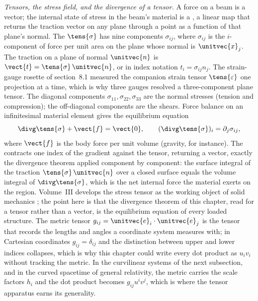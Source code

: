 \begin{mastery}
\textit{Tensors, the stress field, and the divergence of a tensor.}
A force on a beam is a vector; the internal state of stress in the
beam's material is a , a linear map that returns the
traction vector on any plane through a point as a function of that
plane's normal. The  $\tens{\sigma}$ has
nine components $\sigma_{ij}$, where $\sigma_{ij}$ is the $i$-component
of force per unit area on the plane whose normal is $\unitvec{x}_{j}$.
The traction on a plane of normal $\unitvec{n}$ is $\vect{t} =
\tens{\sigma}\,\unitvec{n}$, or in index notation $t_{i} =
\sigma_{ij}n_{j}$. The strain-gauge rosette of section~8.1 measured
the companion strain tensor $\tens{\varepsilon}$ one projection at a
time, which is why three gauges resolved a three-component plane
tensor. The diagonal components $\sigma_{11}, \sigma_{22},
\sigma_{33}$ are the normal stresses (tension and compression); the
off-diagonal components are the shears. Force balance on an
infinitesimal material element gives the equilibrium equation
\[
\divg\tens{\sigma} + \vect{f} = \vect{0}, \qquad
(\divg\tens{\sigma})_{i} = \partial_{j}\sigma_{ij},
\]
where $\vect{f}$ is the body force per unit volume (gravity, for
instance). The  contracts one index of
the gradient against the tensor, returning a vector, exactly the
divergence theorem applied component by component: the surface
integral of the traction $\tens{\sigma}\,\unitvec{n}$ over a closed
surface equals the volume integral of $\divg\tens{\sigma}$, which is
the net internal force the material exerts on the region. Volume~III
develops the stress tensor as the working object of solid mechanics
\cite{text:timoshenko-plates-shells}; the point here is that the
divergence theorem of this chapter, read for a tensor rather than a
vector, is the equilibrium equation of every loaded structure. The
metric tensor $g_{ij} = \unitvec{e}_{i}\cdot\unitvec{e}_{j}$ is the
tensor that records the lengths and angles a coordinate system
measures with; in Cartesian coordinates $g_{ij} = \delta_{ij}$ and the
distinction between upper and lower indices collapses, which is why
this chapter could write every dot product as $u_{i}v_{i}$ without
tracking the metric. In the curvilinear systems of the next
subsection, and in the curved spacetime of general relativity, the
metric carries the scale factors $h_{i}$ and the dot product becomes
$g_{ij}u^{i}v^{j}$, which is where the tensor apparatus earns its
generality.
\end{mastery}

